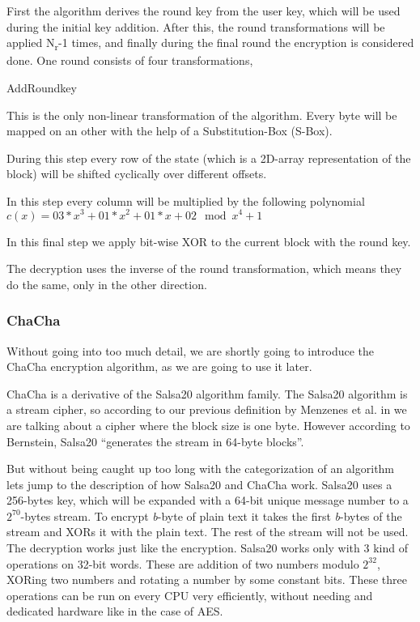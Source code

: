 \documentclass[12pt,a4paper,titlepage,oneside]{scrartcl}
\begin{document}
First the algorithm derives the round key from the user key, which will be used during the initial key addition.
After this, the round transformations will be applied N\textsubscript{r}-1 times, and finally during the final round the encryption is considered done.
One round consists of four transformations,
\begin{labeling}{AddRoundkey}
\item [SubBytes] This is the only non-linear transformation of the algorithm. Every byte will be mapped on an other with the help of a Substitution-Box (S-Box).
\item [ShiftRows] During this step every row of the state (which is a 2D-array representation of the block) will be shifted cyclically over different offsets.
\item [MixColumns] In this step every column will be multiplied by the following polynomial \begin{math} c(x) = 03 * x^3 + 01 * x^2 + 01 * x + 02 \mod x^4 + 1 \end{math}
\item [AddRoundkey] In this final step we apply bit-wise XOR to the current block with the round key.
\end{labeling}
The decryption uses the inverse of the round transformation, which means they do the same, only in the other direction. \cite{daemen2013design}

\subsubsection{ChaCha}
Without going into too much detail, we are shortly going to introduce the ChaCha encryption algorithm, as we are going to use it later.

ChaCha is a derivative of the Salsa20 algorithm family. 
The Salsa20 algorithm is a stream cipher, so according to our previous definition by Menzenes et al. in \cite{menezes1996handbook} we are talking about a cipher where the block size is one byte.
However according to Bernstein, Salsa20 ``generates the stream in 64-byte blocks''. \cite{bernstein2008salsa20}

But without being caught up too long with the categorization of an algorithm lets jump to the description of how Salsa20 and ChaCha work.
Salsa20 uses a 256-bytes key, which will be expanded with a 64-bit unique message number to a \begin{math} 2^{70} \end{math}-bytes stream.
To encrypt \textit{b}-byte of plain text it takes the first \textit{b}-bytes of the stream and XORs it with the plain text.
The rest of the stream will not be used.
The decryption works just like the encryption.
Salsa20 works only with 3 kind of operations on 32-bit words.
These are addition of two numbers modulo \begin{math} 2^{32} \end{math}, XORing two numbers and rotating a number by some constant bits.
These three operations can be run on every CPU very efficiently, without needing and dedicated hardware like in the case of AES. \cite{bernstein2008salsa20}
\end{document}
